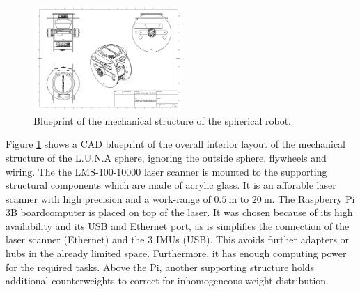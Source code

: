 \begin{figure}
\centering                                                                                                                                                                                                        
\includegraphics[width=0.5\textwidth]{../Media/BlueprintPNG.png}                                                                                                                                                      
\caption{Blueprint of the mechanical structure of the spherical robot.}                                                                                                                                   
\label{sec:TechnicalApproach:fig:blueprint}                                                                                                                                                                       
\end{figure}                                                                                                                                                                                                      
Figure \ref{sec:TechnicalApproach:fig:blueprint} shows a CAD blueprint of the overall interior layout of the mechanical structure of the L.U.N.A sphere, ignoring the outside sphere, flywheels and wiring.
The the LMS-100-10000 laser scanner is mounted to the supporting structural components which are made of acrylic glass. It is an afforable laser scanner with high precision and a work-range of $\SI{0.5}{\meter}$ to $\SI{20}{\meter}$.
The Raspberry Pi 3B boardcomputer is placed on top of the laser. It was chosen because of its high availability and its USB and Ethernet port, as is simplifies the connection of the laser scanner (Ethernet) and the 3 IMUs (USB). This avoids further adapters or hubs in the already limited space. Furthermore, it has enough computing power for the required tasks.
Above the Pi, another supporting structure holds additional counterweights to correct for inhomogeneous weight distribution.                                                                                                     
